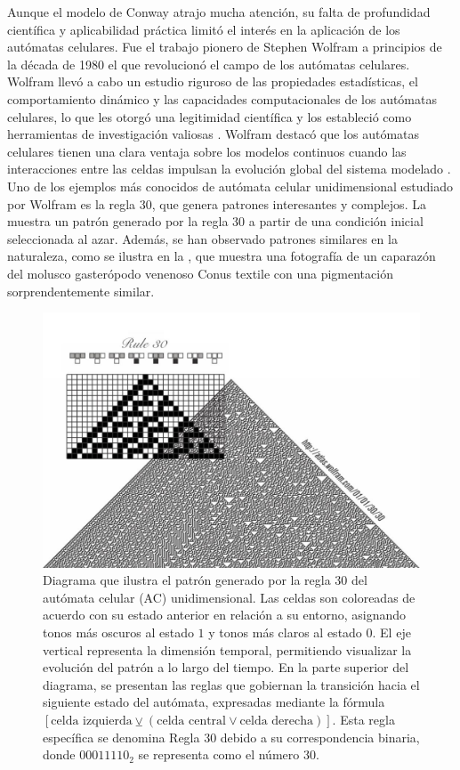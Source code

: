 Aunque el modelo de Conway atrajo mucha atención, su falta de profundidad científica y aplicabilidad práctica limitó el interés en la aplicación de los autómatas celulares. Fue el trabajo pionero de Stephen Wolfram a principios de la década de 1980 el que revolucionó el campo de los autómatas celulares. Wolfram llevó a cabo un estudio riguroso de las propiedades estadísticas, el comportamiento dinámico y las capacidades computacionales de los autómatas celulares, lo que les otorgó una legitimidad científica y los estableció como herramientas de investigación valiosas \cite{wolfram_cellular_2002}. Wolfram destacó que los autómatas celulares tienen una clara ventaja sobre los modelos continuos cuando las interacciones entre las celdas impulsan la evolución global del sistema modelado \cite{lehotzky_cellular_2019}. Uno de los ejemplos más conocidos de autómata celular unidimensional estudiado por Wolfram es la regla $30$, que genera patrones interesantes y complejos. La  muestra un patrón generado por la regla 30 a partir de una condición inicial seleccionada al azar. Además, se han observado patrones similares en la naturaleza, como se ilustra en la , que muestra una fotografía de un caparazón del molusco gasterópodo venenoso Conus textile con una pigmentación sorprendentemente similar.


  
\begin{figure}[h!]
	\centering\includegraphics[width=\imsize]{regla30.jpg}
	\caption[ Diagrama que ilustra el patrón generado por la regla 30 del autómata celular (AC) unidimensional.]{  Diagrama que ilustra el patrón generado por la regla 30 del autómata celular (AC)  unidimensional.  Las celdas son coloreadas de acuerdo con su estado anterior en relación a su entorno, asignando tonos más oscuros al estado $1$ y tonos más claros al estado $0$. El eje vertical representa la dimensión temporal, permitiendo visualizar la evolución del patrón a lo largo del tiempo. En la parte superior del diagrama, se presentan las reglas que gobiernan la transición hacia el siguiente estado del autómata, expresadas mediante la fórmula $[\text{celda izquierda} \veebar (\text{celda central} \lor \text{celda derecha})]$. Esta regla específica se denomina Regla $30$ debido a su correspondencia binaria, donde ${00011110}_2$ se representa como el número 30.} \label{fig:regla30}
\end{figure}

